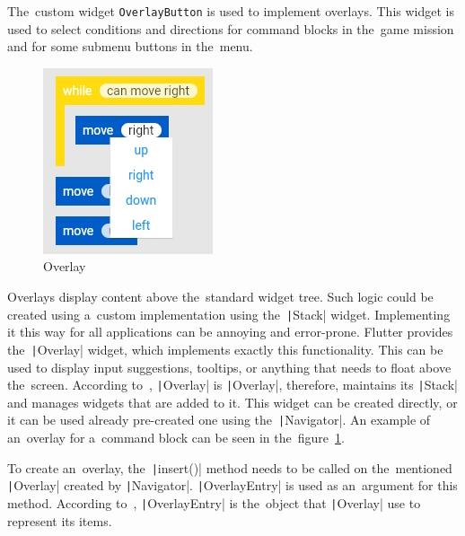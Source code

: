 The~custom widget \texttt{OverlayButton} is used to implement overlays.
This widget is used to select conditions and directions for command blocks in the~game mission and for some submenu buttons in the~menu.

\begin{figure}
    \centering
    \includegraphics[width=0.4\linewidth]{assets/implementation/overlay.jpeg}
    \caption{Overlay}
    \label{fig:overlay}
\end{figure}

Overlays display content above the~standard widget tree.
Such logic could be created using a~custom implementation using the~\texttt|Stack| widget.
Implementing it this way for all applications can be annoying and error-prone.
Flutter provides the~\texttt|Overlay| widget, which implements exactly this functionality.
This can be used to display input suggestions, tooltips, or anything that needs to float above the~screen.
According to~\cite{a2022_material}, \texttt|Overlay| is 
\texttt|Overlay|, therefore, maintains its \texttt|Stack| and manages widgets that are added to it.
This widget can be created directly, or it can be used already pre-created one using the~\texttt|Navigator|.
An example of an~overlay for a~command block can be seen in the~figure~\ref{fig:overlay}.

To create an~overlay, the~\texttt|insert()| method needs to be called on the~mentioned \texttt|Overlay| created by \texttt|Navigator|.
\texttt|OverlayEntry| is used as an~argument for this method.
According to~\cite{a2022_material}, \texttt|OverlayEntry| is the~object that \texttt|Overlay| use to represent its items.

